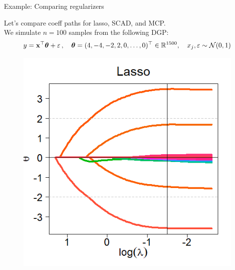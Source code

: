 \documentclass[11pt,compress,t,notes=noshow, xcolor=table]{beamer}
\begin{document}
\begin{vbframe}{Example: Comparing regularizers}

Let's compare coeff paths for lasso, SCAD, and MCP.\\
\vspace{0.15cm}
We simulate $n=100$ samples from the following DGP:
{\small
$$y = \mathbf{x}^{\top} \bm{\theta} + \varepsilon\,,\quad \bm{\theta} =(4,-4,-2,2,0,\ldots,0)^{\top} \in \mathbb{R}^{1500}, \quad x_j,\varepsilon \sim \mathcal{N}(0,1)$$
}
\vspace{-1cm}

  \begin{figure}[h]
    \begin{minipage}{0.32\linewidth}
      \vspace{3pt}
      \centerline{\includegraphics[width=\textwidth]{figure/ncpen-compar-lasso.png}}
    \end{minipage}
    \begin{minipage}{0.32\linewidth}
      \vspace{3pt}

\end{minipage}
\end{figure}
\end{vbframe}
\end{document}
